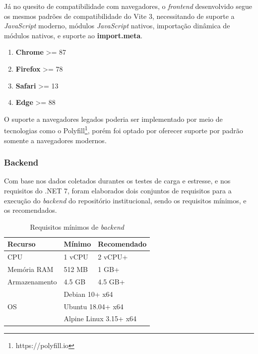 Já no quesito de compatibilidade com navegadores, o \emph{frontend} desenvolvido segue
os mesmos padrões de compatibilidade do Vite 3, necessitando de suporte a \emph{JavaScript}
moderno, módulos \emph{JavaScript} nativos, importação dinâmica de módulos nativos,
e suporte ao \textbf{import.meta}.

\begin{enumerate}
    \item \textbf{Chrome} >= 87
    \item \textbf{Firefox} >= 78
    \item \textbf{Safari} >= 13
    \item \textbf{Edge} >= 88
\end{enumerate}

O suporte a navegadores legados poderia ser implementado por meio de
tecnologias como o Polyfill\footnote{https://polyfill.io}, porém foi
optado por oferecer suporte por padrão somente a navegadores modernos.

\subsubsection{Backend}

Com base nos dados coletados durantes os testes de carga e estresse,
e nos requisitos do .NET 7, foram elaborados dois conjuntos de requisitos
para a execução do \emph{backend} do repositório institucional, sendo os
requisitos mínimos, e os recomendados.

\begin{table}[H]
    \caption{Requisitos mínimos de \emph{backend}}
    \label{quad:requisitos-backend}
    \begin{tabular}{|p{9.5cm}|ll|}
        \hline
        \textbf{Recurso}    & \multicolumn{1}{l|}{\textbf{Mínimo}}        & \textbf{Recomendado} \\ \hline
        CPU                 & \multicolumn{1}{l|}{1 vCPU}                 & 2 vCPU+              \\ \hline
        Memória RAM         & \multicolumn{1}{l|}{512 MB}                 & 1 GB+                \\ \hline
        Armazenamento       & \multicolumn{1}{l|}{4.5 GB}                 & 4.5 GB+              \\ \hline
        \multirow{3}{*}{OS} & \multicolumn{2}{l|}{Debian 10+ x64}                                \\ \cline{2-3}
                            & \multicolumn{2}{l|}{Ubuntu 18.04+ x64}                             \\ \cline{2-3}
                            & \multicolumn{2}{l|}{Alpine Linux 3.15+ x64}                        \\ \hline
    \end{tabular}
\end{table}

